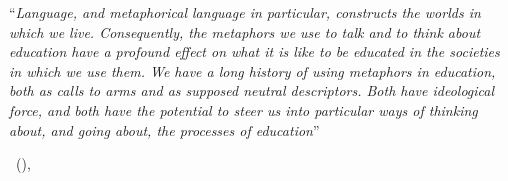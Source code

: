 \documentclass[
12pt, %
oneside, %
english, %
onehalfspacing,
headsepline, %
]{MastersDoctoralThesis} %
\newcommand\mycite[2][]{\citeauthor{#2}\ (\citeyear{#2})\ifx#1\undefined\else, #1\fi}
\begin{document}
\rule{0mm}{30mm}
\noindent\begin{singlespace}\enquote{\itshape Language, and
  metaphorical language in particular, constructs the worlds in which
  we live. Consequently, the metaphors we use to talk and to think
  about education have a profound effect on what it is like to be
  educated in the societies in which we use them.  We have a long
  history of using metaphors in education, both as calls to arms and
  as supposed neutral descriptors.  Both have ideological force, and
  both have the potential to steer us into particular ways of thinking
  about, and going about, the processes of
  education}\bigbreak\end{singlespace}
\hfill\mycite{paechter2004}











\pagestyle{thesis} %



\end{document}
